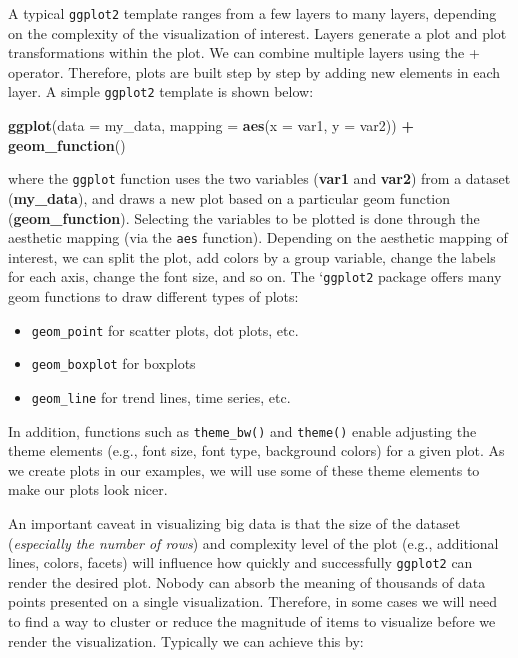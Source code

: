 \documentclass[]{book}
\newenvironment{Shaded}{\begin{snugshade}}{\end{snugshade}}
\newcommand{\DataTypeTok}[1]{\textcolor[rgb]{0.13,0.29,0.53}{#1}}
\newcommand{\KeywordTok}[1]{\textcolor[rgb]{0.13,0.29,0.53}{\textbf{#1}}}
\newcommand{\NormalTok}[1]{#1}
\newcommand{\OperatorTok}[1]{\textcolor[rgb]{0.81,0.36,0.00}{\textbf{#1}}}
\newcommand{\StringTok}[1]{\textcolor[rgb]{0.31,0.60,0.02}{#1}}
\providecommand{\tightlist}{%
  \setlength{\itemsep}{0pt}\setlength{\parskip}{0pt}}
\begin{document}
A typical \texttt{ggplot2} template ranges from a few layers to many layers, depending on the complexity of the visualization of interest. Layers generate a plot and plot transformations within the plot. We can combine multiple layers using the + operator. Therefore, plots are built step by step by adding new elements in each layer. A simple \texttt{ggplot2} template is shown below:

\begin{Shaded}
\begin{Highlighting}[]
\KeywordTok{ggplot}\NormalTok{(}\DataTypeTok{data =}\NormalTok{ my_data,}
       \DataTypeTok{mapping =} \KeywordTok{aes}\NormalTok{(}\DataTypeTok{x =}\NormalTok{ var1, }\DataTypeTok{y =}\NormalTok{ var2)) }\OperatorTok{+}
\StringTok{  }\KeywordTok{geom_function}\NormalTok{()}
\end{Highlighting}
\end{Shaded}

where the \texttt{ggplot} function uses the two variables (\textbf{var1} and \textbf{var2}) from a dataset (\textbf{my\_data}), and draws a new plot based on a particular geom function (\textbf{geom\_function}). Selecting the variables to be plotted is done through the aesthetic mapping (via the \texttt{aes} function). Depending on the aesthetic mapping of interest, we can split the plot, add colors by a group variable, change the labels for each axis, change the font size, and so on. The `\texttt{ggplot2} package offers many geom functions to draw different types of plots:

\begin{itemize}
\tightlist
\item
  \texttt{geom\_point} for scatter plots, dot plots, etc.
\item
  \texttt{geom\_boxplot} for boxplots
\item
  \texttt{geom\_line} for trend lines, time series, etc.
\end{itemize}

In addition, functions such as \texttt{theme\_bw()} and \texttt{theme()} enable adjusting the theme elements (e.g., font size, font type, background colors) for a given plot. As we create plots in our examples, we will use some of these theme elements to make our plots look nicer.

An important caveat in visualizing big data is that the size of the dataset (\emph{especially the number of rows}) and complexity level of the plot (e.g., additional lines, colors, facets) will influence how quickly and successfully \texttt{ggplot2} can render the desired plot. Nobody can absorb the meaning of thousands of data points presented on a single visualization. Therefore, in some cases we will need to find a way to cluster or reduce the magnitude of items to visualize before we render the visualization. Typically we can achieve this by:
\end{document}
